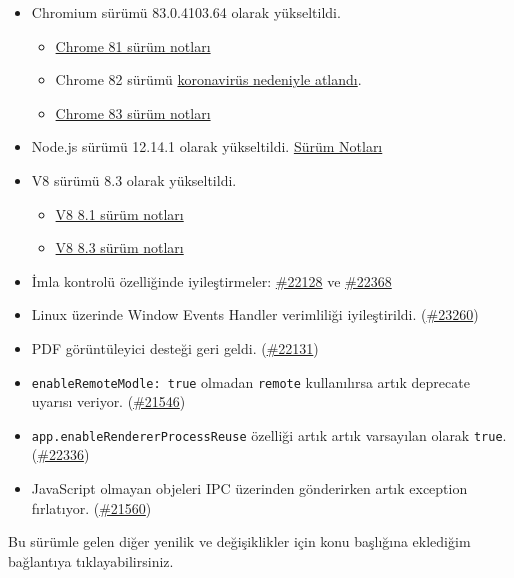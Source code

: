 \documentclass[11pt]{article}
\begin{document}
\begin{itemize}
\item Chromium sürümü 83.0.4103.64 olarak yükseltildi.
\begin{itemize}
\item \href{https://developers.google.com/web/updates/2020/04/nic81}{Chrome 81 sürüm notları}
\item Chrome 82 sürümü \href{https://chromereleases.googleblog.com/2020/03/chrome-and-chrome-os-release-updates.html}{koronavirüs nedeniyle atlandı}.
\item \href{https://developers.google.com/web/updates/2020/05/nic83}{Chrome 83 sürüm notları}
\end{itemize}
\item Node.js sürümü 12.14.1 olarak yükseltildi. \href{https://nodejs.org/en/blog/release/v12.14.1/}{Sürüm Notları}
\item V8 sürümü 8.3 olarak yükseltildi.
\begin{itemize}
\item \href{https://v8.dev/blog/v8-release-81}{V8 8.1 sürüm notları}
\item \href{https://v8.dev/blog/v8-release-83}{V8 8.3 sürüm notları}
\end{itemize}
\item İmla kontrolü özelliğinde iyileştirmeler: \href{https://github.com/electron/electron/pull/22128}{\#22128} ve \href{https://github.com/electron/electron/pull/22368}{\#22368}
\item Linux üzerinde Window Events Handler verimliliği iyileştirildi. (\href{https://github.com/electron/electron/pull/23260}{\#23260})
\item PDF görüntüleyici desteği geri geldi. (\href{https://github.com/electron/electron/pull/22131}{\#22131})
\item \texttt{enableRemoteModle: true} olmadan \texttt{remote} kullanılırsa artık deprecate
uyarısı veriyor. (\href{https://github.com/electron/electron/pull/21546}{\#21546})
\item \texttt{app.enableRendererProcessReuse} özelliği artık artık varsayılan olarak
\texttt{true}. (\href{https://github.com/electron/electron/pull/22336}{\#22336})
\item JavaScript olmayan objeleri IPC üzerinden gönderirken artık exception
fırlatıyor. (\href{https://github.com/electron/electron/pull/21560}{\#21560})
\end{itemize}

Bu sürümle gelen diğer yenilik ve değişiklikler için konu başlığına eklediğim
bağlantıya tıklayabilirsiniz.
\end{document}
